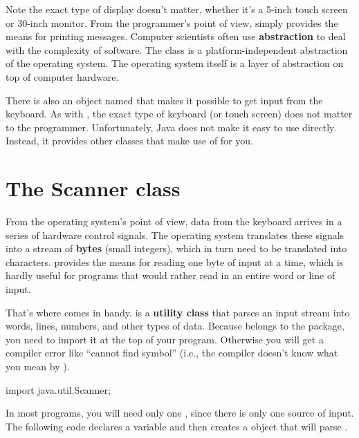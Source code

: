 
Note the exact type of display doesn't matter, whether it's a 5-inch touch screen or 30-inch monitor.
From the programmer's point of view,  simply provides the means for printing messages.
Computer scientists often use {\bf abstraction} to deal with the complexity of software.
The  class is a platform-independent abstraction of the operating system.
The operating system itself is a layer of abstraction on top of computer hardware.

There is also an object named  that makes it possible to get input from the keyboard.
As with , the exact type of keyboard (or touch screen) does not matter to the programmer.
Unfortunately, Java does not make it easy to use  directly.
Instead, it provides other classes that make use of  for you.


\section{The Scanner class}


From the operating system's point of view, data from the keyboard arrives in a series of hardware control signals.
The operating system translates these signals into a stream of \textbf{bytes} (small integers), which in turn need to be translated into characters.
 provides the means for reading one byte of input at a time, which is hardly useful for programs that would rather read in an entire word or line of input.


That's where  comes in handy.
 is a {\bf utility class} that parses an input stream into words, lines, numbers, and other types of data.
Because  belongs to the  package, you need to import it at the top of your program.
Otherwise you will get a compiler error like ``cannot find symbol'' (i.e., the compiler doesn't know what you mean by ).

\begin{code}
import java.util.Scanner;
\end{code}

In most programs, you will need only one , since there is only one source of input.
The following code declares a  variable and then creates a  object that will parse .

